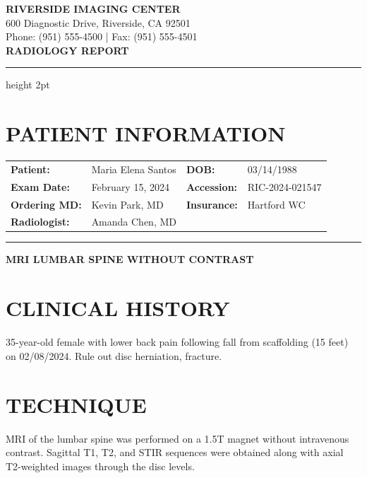 \documentclass[11pt]{article}
\begin{document}
\begin{center}
{\Large\bfseries\color{imagingpurple} RIVERSIDE IMAGING CENTER}\\[0.3em]
{\small 600 Diagnostic Drive, Riverside, CA 92501}\\
{\small Phone: (951) 555-4500 | Fax: (951) 555-4501}\\[1em]
{\LARGE\bfseries RADIOLOGY REPORT}
\end{center}

\vspace{0.5em}
\hrule height 2pt
\vspace{1em}

\section*{PATIENT INFORMATION}

\begin{tabular}{@{}p{3.5cm}p{5cm}p{3cm}p{4cm}@{}}
\textbf{Patient:} & Maria Elena Santos & \textbf{DOB:} & 03/14/1988 \\
\textbf{Exam Date:} & February 15, 2024 & \textbf{Accession:} & RIC-2024-021547 \\
\textbf{Ordering MD:} & Kevin Park, MD & \textbf{Insurance:} & Hartford WC \\
\textbf{Radiologist:} & Amanda Chen, MD & & \\
\end{tabular}

\vspace{1em}
\hrule
\vspace{1em}

\begin{center}
{\Large\bfseries MRI LUMBAR SPINE WITHOUT CONTRAST}
\end{center}

\section*{CLINICAL HISTORY}

35-year-old female with lower back pain following fall from scaffolding (15 feet) on 02/08/2024. Rule out disc herniation, fracture.

\section*{TECHNIQUE}

MRI of the lumbar spine was performed on a 1.5T magnet without intravenous contrast. Sagittal T1, T2, and STIR sequences were obtained along with axial T2-weighted images through the disc levels.
\end{document}
